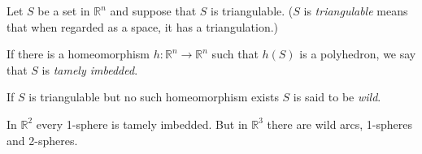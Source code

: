 \documentclass[12pt]{article}
\begin{document}
Let $S$ be a set in ${\mathbb{R}}^n$ and suppose that $S$ is triangulable.
($S$ is \emph{triangulable} means that when regarded as a space, it has a triangulation.)

If there is a homeomorphism $h: {\mathbb{R}}^n \to {\mathbb{R}}^n$ such that
$h(S)$ is a polyhedron, we say that $S$ is \emph{tamely imbedded}.

If $S$ is triangulable but no such homeomorphism exists $S$ is said to be
\emph{wild}.

In ${\mathbb{R}}^2$ every 1-sphere is tamely imbedded. But 
in ${\mathbb{R}}^3$ there are wild arcs, 1-spheres and 2-spheres. 

 
\end{document}
